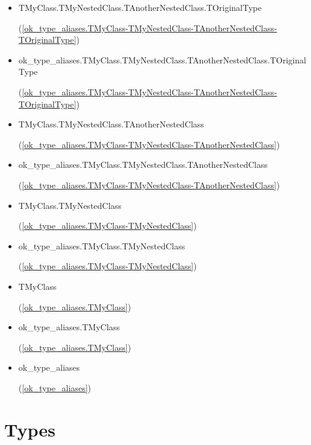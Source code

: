 \documentclass{report}
\newif\ifpdf
\begin{document}
\begin{list}{}
\begin{itemize}
\item \begin{ttfamily}TMyClass.TMyNestedClass.TAnotherNestedClass.TOriginalType\end{ttfamily}(\ref{ok_type_aliases.TMyClass-TMyNestedClass-TAnotherNestedClass-TOriginalType})
\item \begin{ttfamily}ok{\_}type{\_}aliases.TMyClass.TMyNestedClass.TAnotherNestedClass.TOriginalType\end{ttfamily}(\ref{ok_type_aliases.TMyClass-TMyNestedClass-TAnotherNestedClass-TOriginalType})
\item \begin{ttfamily}TMyClass.TMyNestedClass.TAnotherNestedClass\end{ttfamily}(\ref{ok_type_aliases.TMyClass-TMyNestedClass-TAnotherNestedClass})
\item \begin{ttfamily}ok{\_}type{\_}aliases.TMyClass.TMyNestedClass.TAnotherNestedClass\end{ttfamily}(\ref{ok_type_aliases.TMyClass-TMyNestedClass-TAnotherNestedClass})
\item \begin{ttfamily}TMyClass.TMyNestedClass\end{ttfamily}(\ref{ok_type_aliases.TMyClass-TMyNestedClass})
\item \begin{ttfamily}ok{\_}type{\_}aliases.TMyClass.TMyNestedClass\end{ttfamily}(\ref{ok_type_aliases.TMyClass-TMyNestedClass})
\item \begin{ttfamily}TMyClass\end{ttfamily}(\ref{ok_type_aliases.TMyClass})
\item \begin{ttfamily}ok{\_}type{\_}aliases.TMyClass\end{ttfamily}(\ref{ok_type_aliases.TMyClass})
\item \begin{ttfamily}ok{\_}type{\_}aliases\end{ttfamily}(\ref{ok_type_aliases})
\end{itemize}

\end{list}
\section{Types}
\ifpdf
\end{document}
